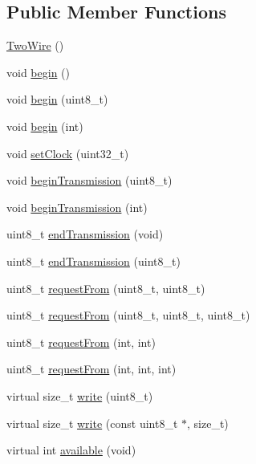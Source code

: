 \subsection*{Public Member Functions}
\begin{DoxyCompactItemize}
\item 
\hyperlink{class_two_wire_a4c7daf378c06e5e72762e1bd3d5937b6}{Two\+Wire} ()
\item 
void \hyperlink{class_two_wire_ada85a7a8663ec8af0a1248b659be2f18}{begin} ()
\item 
void \hyperlink{class_two_wire_a28bca087ed188781ef15e72622d3b1fb}{begin} (uint8\+\_\+t)
\item 
void \hyperlink{class_two_wire_a2806aa5684d36d7d20bf7c51cab3e602}{begin} (int)
\item 
void \hyperlink{class_two_wire_a3c4aaae8779a8c34d8a1a90ff317d982}{set\+Clock} (uint32\+\_\+t)
\item 
void \hyperlink{class_two_wire_a8d55f00ea8ac3d7427d62e0c71e95ec2}{begin\+Transmission} (uint8\+\_\+t)
\item 
void \hyperlink{class_two_wire_a4da95eb4adced5dad152344243e57aad}{begin\+Transmission} (int)
\item 
uint8\+\_\+t \hyperlink{class_two_wire_af80f9a7b85a3a81a035ca94c95bcdc1d}{end\+Transmission} (void)
\item 
uint8\+\_\+t \hyperlink{class_two_wire_a289f5ef9bb0f79b31095fd72402ed54a}{end\+Transmission} (uint8\+\_\+t)
\item 
uint8\+\_\+t \hyperlink{class_two_wire_ae27d0936487551a05a1e9901bc456599}{request\+From} (uint8\+\_\+t, uint8\+\_\+t)
\item 
uint8\+\_\+t \hyperlink{class_two_wire_a4b4b618531a04d5488a52583a3dfb173}{request\+From} (uint8\+\_\+t, uint8\+\_\+t, uint8\+\_\+t)
\item 
uint8\+\_\+t \hyperlink{class_two_wire_ad40a27213d0bb32f7b819aa8962fccd3}{request\+From} (int, int)
\item 
uint8\+\_\+t \hyperlink{class_two_wire_a3d76da36fb8571e0b5e8310e9f86f6fe}{request\+From} (int, int, int)
\item 
virtual size\+\_\+t \hyperlink{class_two_wire_a318b7bec156c1f1075a818c0ad3427d7}{write} (uint8\+\_\+t)
\item 
virtual size\+\_\+t \hyperlink{class_two_wire_a1957b4d5a6a997bdde436e9e40d131a7}{write} (const uint8\+\_\+t $\ast$, size\+\_\+t)
\item 
virtual int \hyperlink{class_two_wire_aee57bc52bee06508e231c5fc6bc35ada}{available} (void)

\end{DoxyCompactItemize}
